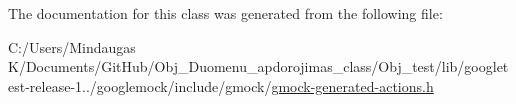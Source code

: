 The documentation for this class was generated from the following file\+:\begin{DoxyCompactItemize}
\item 
C\+:/\+Users/\+Mindaugas K/\+Documents/\+Git\+Hub/\+Obj\+\_\+\+Duomenu\+\_\+apdorojimas\+\_\+class/\+Obj\+\_\+test/lib/googletest-\/release-\/1../googlemock/include/gmock/\mbox{\hyperlink{_obj__test_2lib_2googletest-release-1_88_81_2googlemock_2include_2gmock_2gmock-generated-actions_8h}{gmock-\/generated-\/actions.\+h}}\end{DoxyCompactItemize}
